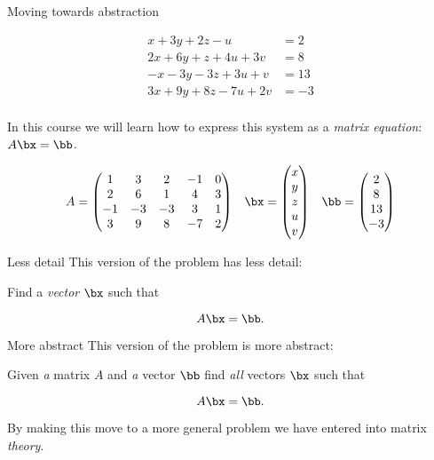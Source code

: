 \documentclass{beamer}
\begin{document}
\begin{frame}{Moving towards abstraction}

\begin{align*}
 x + 3y + 2z - u  \qquad &= 2 \\
2x + 6y + z + 4u + 3v  &= 8 \\
-x -3y  -3z + 3u + v  &= 13 \\
3x + 9y + 8z  -7u + 2v  &= -3 \\
\end{align*}

In this course we will learn how to express this system as a \emph{matrix equation}: $A \bx = \bb$.

$$
\begin{matrix}
A =
\begin{pmatrix}
1 & 3 & 2 & -1 & 0 \\
2 & 6 & 1 & 4 & 3\\
-1 & -3 & -3 & 3 & 1 \\
3 & 9 & 8 & -7 & 2
\end{pmatrix}
&
\bx =
\begin{pmatrix}
x \\ y \\ z \\ u \\ v
\end{pmatrix}
&
\bb =
\begin{pmatrix}
2 \\ 8 \\ 13 \\ -3
\end{pmatrix}
\end{matrix}
$$

\end{frame}

\begin{frame} {Less detail}
This version of the problem has less detail:

\pause

Find a \emph{vector} $\bx$ such that

$$A \bx = \bb.$$
\end{frame}

\begin{frame} {More abstract}
This version of the problem is more abstract:

\pause

Given \emph{a} matrix $A$ and \emph{a} vector $\bb$ find \emph{all} vectors $\bx$ such that

$$A \bx = \bb.$$

\pause

By making this move to a more general problem we have entered into matrix \emph{theory}.
\end{frame}
\end{document}
